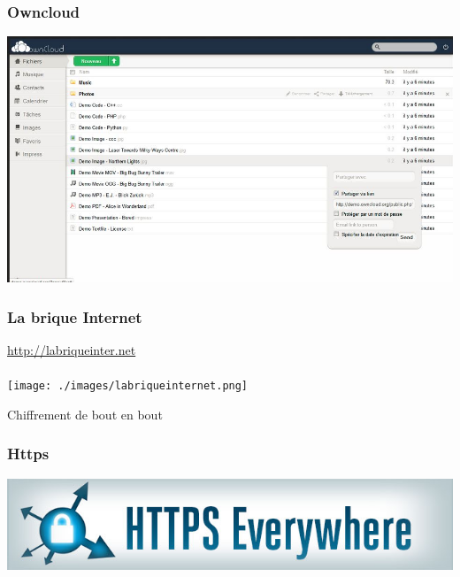 \documentclass{beamer}
\begin{document}
\begin{frame}
\begin{center}
\frametitle{Owncloud}
\includegraphics[scale=0.6] {./images/owncloud.jpg}
\end{center}
\end{frame}
\begin{frame}
\begin{center}
\frametitle{La brique Internet}
\url{http://labriqueinter.net}
\\~\\
\texttt{[image: ./images/labriqueinternet.png]}
\end{center}
\end{frame}

\begin{frame}
\begin{center}
\Huge {Chiffrement de bout en bout}
\end{center}
\end{frame}


\begin{frame}
\begin{center}
\frametitle{Https}
\includegraphics[scale=0.5] {./images/https-everywhere.jpg}
\end{center}
\end{frame}
\end{document}
